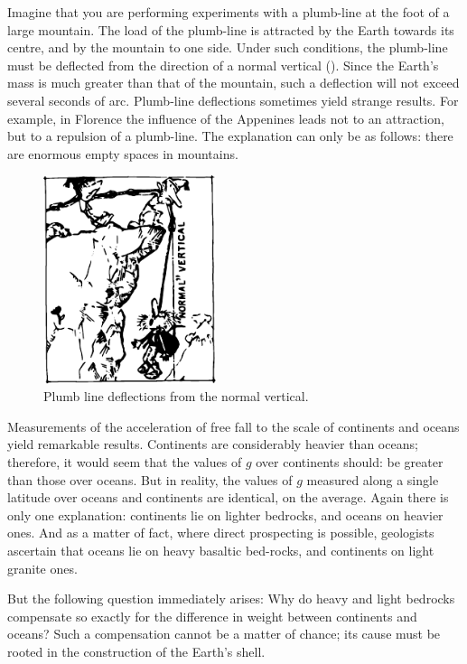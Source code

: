 Imagine that you are performing experiments with
a plumb-line at the foot of a large mountain. The load of
the plumb-line is attracted by the Earth towards its
centre, and by the mountain to one side. Under such
conditions, the plumb-line must be deflected from the
direction of a normal vertical (). Since the
Earth's mass is much greater than that of the mountain,
such a deflection will not exceed several seconds of arc.
Plumb-line deflections sometimes yield strange results.
For example, in Florence the influence of the Appenines
leads not to an attraction, but to a repulsion of a plumb-line. The explanation can only be as follows: there are
enormous empty spaces in mountains.
 \begin{figure}[!ht]
 \centering
 \includegraphics[width=0.45\textwidth]{figures/fig-6-3.pdf}
 \caption{Plumb line deflections from the normal vertical.}
 \label{fig-6-3}
 \end{figure}
Measurements of the acceleration of free fall to the
scale of continents and oceans yield remarkable results.
Continents are considerably heavier than oceans; therefore,
it would seem that the values of $g$ over continents should:
be greater than those over oceans. But in reality, the
values of $g$ measured along a single latitude over oceans
and continents are identical, on the average. Again there
is only one explanation: continents lie on lighter bedrocks, and oceans on heavier ones. And as a matter of
fact, where direct prospecting is possible, geologists
ascertain that oceans lie on heavy basaltic bed-rocks,
and continents on light granite ones.

But the following question immediately arises: Why do
heavy and light bedrocks compensate so exactly for the
difference in weight between continents and oceans? Such
a compensation cannot be a matter of chance; its cause
must be rooted in the construction of the Earth's shell.

